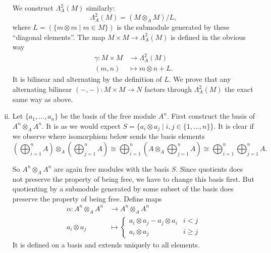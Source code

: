 \begin{exercise}{4}
\begin{enumerate}[i)]
            We construct $\Lambda^2_A(M)$ similarly:
            \begin{equation*}
                \Lambda^2_A(M) = (M \otimes_A M) / L,
            \end{equation*}
            where $L = (\{ m \otimes m \mid m \in M\})$ is the submodule
            generated by these ``diagonal elements''. The map $M \times M
            \rightarrow \Lambda^2_A(M)$ is defined in the obvious way
            \begin{align*}
                \gamma \colon M \times M &\rightarrow \Lambda^2_A(M) \\
                (m, n) &\mapsto m \otimes n + L.
            \end{align*}
            It is bilinear and alternating by the definition of $L$.
            We prove that any alternating bilinear $(-, -) \colon M \times M
            \rightarrow N$ factors through $\Lambda^2_A(M)$ the exact same way
            as above.

        \item Let $\{a_1, \ldots, a_n\}$ be the basis of the free module
            $A^n$. First construct the basis of $A^n \otimes_A A^n$. It is as we
            would expect $S = \{ a_i \otimes a_j \mid i, j \in \{1, \ldots,
            n\}\}$. It is clear if we observe where isomorphism below sends the
            basis elements
            \begin{equation*}
                (\bigoplus^n_{i=1} A) \otimes_A (\bigoplus^n_{j=1} A) \cong
                \bigoplus^n_{i=1} (A \otimes_A \bigoplus^n_{j=1} A) \cong
                \bigoplus^n_{i=1} \bigoplus^n_{j=1} A.
            \end{equation*}

            So $A^n \otimes_A A^n$ are again free modules with the basis $S$.
            Since quotients does not preserve the property of being free, we
            have to change this basis first. But quotienting by a submodule
            generated by some subset of the basis does preserve the property of
            being free. Define maps
            \begin{align*}
                \alpha \colon A^n \otimes_A A^n &\rightarrow A^n \otimes_A A^n
                \\
                a_i \otimes a_j &\mapsto 
                \begin{cases} 
                    a_i \otimes a_j - a_j \otimes a_i & i < j \\
                    a_i \otimes a_j & i \geq j 
                \end{cases}
            \end{align*}
            It is defined on a basis and extends uniquely to all elements.


\end{enumerate}
\end{exercise}
